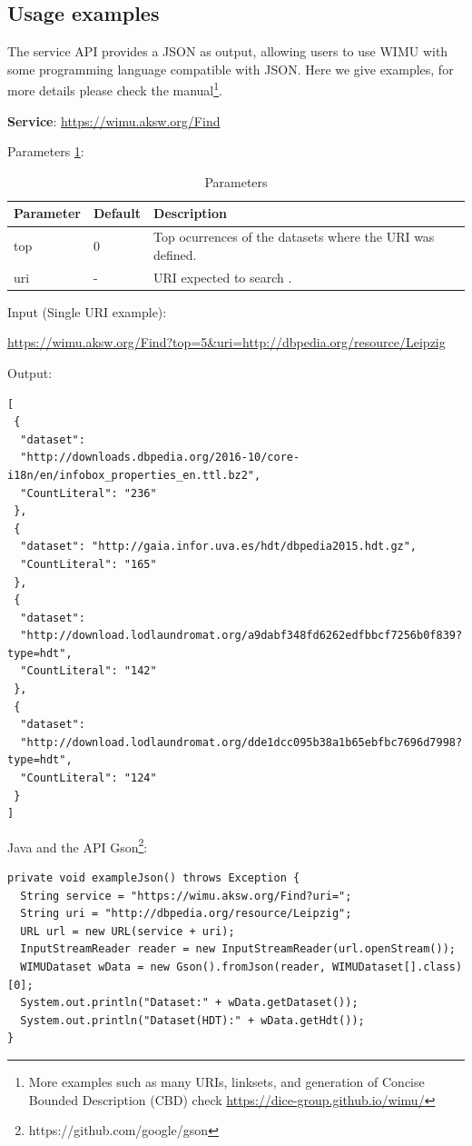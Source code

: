 \subsection{Usage examples}
The service API provides a JSON as output, allowing users to use WIMU with some programming language compatible with JSON.
Here we give examples, for more details please check the manual\footnote{More examples such as many URIs, linksets, and generation of Concise Bounded Description (CBD) check \url{https://dice-group.github.io/wimu/}}.

\textbf{Service}: \url{https://wimu.aksw.org/Find}

Parameters \cref{tab:param}:
\begin{table}[]
\centering
\caption{Parameters}
\label{tab:param}
\begin{tabular}{@{}lll@{}}
\toprule
\textbf{Parameter} & \textbf{Default} & \textbf{Description}                                      \\ \midrule
top                & 0                & Top ocurrences of the datasets where the URI was defined. \\
uri                & -                & URI expected to search .                                  \\ \bottomrule
\end{tabular}
\end{table}

Input (Single URI example): 

\url{https://wimu.aksw.org/Find?top=5&uri=http://dbpedia.org/resource/Leipzig}

Output:
\begin{verbatim}
[
 {
  "dataset": 
  "http://downloads.dbpedia.org/2016-10/core-i18n/en/infobox_properties_en.ttl.bz2",
  "CountLiteral": "236"
 },
 {
  "dataset": "http://gaia.infor.uva.es/hdt/dbpedia2015.hdt.gz",
  "CountLiteral": "165"
 },
 {
  "dataset": 
  "http://download.lodlaundromat.org/a9dabf348fd6262edfbbcf7256b0f839?type=hdt",
  "CountLiteral": "142"
 },
 {
  "dataset": 
  "http://download.lodlaundromat.org/dde1dcc095b38a1b65ebfbc7696d7998?type=hdt",
  "CountLiteral": "124"
 }
]
\end{verbatim}

Java and the API Gson\footnote{https://github.com/google/gson}:
\begin{verbatim}
private void exampleJson() throws Exception {
  String service = "https://wimu.aksw.org/Find?uri=";
  String uri = "http://dbpedia.org/resource/Leipzig";
  URL url = new URL(service + uri);
  InputStreamReader reader = new InputStreamReader(url.openStream());
  WIMUDataset wData = new Gson().fromJson(reader, WIMUDataset[].class)[0];
  System.out.println("Dataset:" + wData.getDataset());
  System.out.println("Dataset(HDT):" + wData.getHdt());
}
\end{verbatim}


